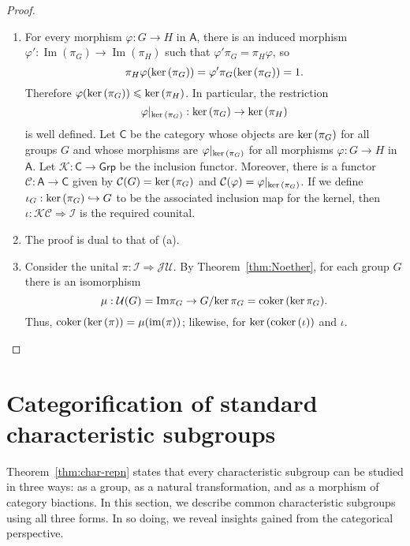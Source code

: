 \documentclass{amsart}
\newcommand{\Cat}[1]{\mathsf{#1}}
\newcommand{\cat}[1]{\Cat{#1}}
\newcommand{\acat}[1]{\mathsf{#1}}
\numberwithin{lstfloat}{section}
\DeclareMathOperator{\im}{Im}
\renewcommand{\ker}{{\rm ker\,}}
\newcommand{\coker}{{\rm coker\,}}
\renewcommand{\leq}{\leqslant}
\newcommand{\counital}{\iota}
\newcommand{\unital}{\pi}
\newcommand{\func}[1]{\mathcal{#1}}
\newcommand{\fU}{\func{U}}
\newenvironment{iprf}{\begin{enumerate}[label=(\alph*), ref=(\alph*),
      labelwidth=-18pt, leftmargin=0pt, topsep=3pt, itemsep=2pt, parsep=2pt]}
      {\end{enumerate}}
\renewcommand{\leq}{\leqslant}
\theoremstyle{definition}
\theoremstyle{remark}
\numberwithin{equation}{section}
\begin{document}
\begin{proof}
  \begin{iprf}
  \item For every morphism $\varphi:G\to H$ in $\cat{A}$, there is an induced
  morphism $\varphi':\im(\unital_G)\to \im (\unital_{H})$ such that
  $\varphi'\unital_{G}=\unital_H\varphi$, so
  \[
    \unital_{H}\varphi(\ker(\unital_G))
    =\varphi' \unital_G (\ker (\unital_G))=1.
  \]
  Therefore $\varphi(\ker(\unital_G))\leq \ker (\unital_{H})$.
  In particular, the restriction 
  \begin{equation*}
    \varphi|_{\ker (\unital_G)}:\ker(\unital_G)\to \ker(\unital_{H})
  \end{equation*}
  is well defined. Let $\cat{C}$ be the category whose objects
  are $\ker(\unital_G)$ for all groups $G$ and whose morphisms are $\varphi|_{\ker (\unital_G)}$ for all morphisms $\varphi : G\to  H$ in $\cat{A}$. Let $\func{K}: \acat{C}\to \acat{Grp}$ be the inclusion functor. Moreover,
  there is a functor $\func{C}: \cat{A} \to \cat{C}$ given
  by $\func{C}(G) = \ker(\unital_G)$ and $\func{C}(\varphi) = \varphi|_{\ker
  (\unital_G)}$. If we define $\counital_G: \ker(\unital_G)\hookrightarrow G$ to be the
  associated inclusion map for the kernel, then  $\counital:
  \func{K}\func{C}\Rightarrow \func{I}$ is the required counital.

  \item The proof is dual to that of (a).

  \item Consider the unital $\unital : \func{I} \Rightarrow
  \func{J} \func{U}$. By Theorem~\ref{thm:Noether},
  for each group $G$ there is an isomorphism
  \[ 
    \mu: \fU(G)=\mathrm{Im}\pi_G \to  G/\ker\unital_G=\coker (\ker\unital_G).
  \] 
  Thus, 
$\coker (\ker (\unital))=\mu (\text{im}(\pi))$; 
   likewise, for $\ker (\coker (\counital))$ and  $\counital$. \qedhere
  \end{iprf}
\end{proof}


\section{Categorification of standard characteristic subgroups}
\label{sec:examples}

Theorem~\ref{thm:char-repn} states that every characteristic subgroup can be studied in
three ways: as a group, as a natural transformation, and as a morphism of category
biactions. In this section, we describe common characteristic subgroups using  
all three forms. In so doing, we reveal insights gained from the categorical perspective. 
\end{document}
